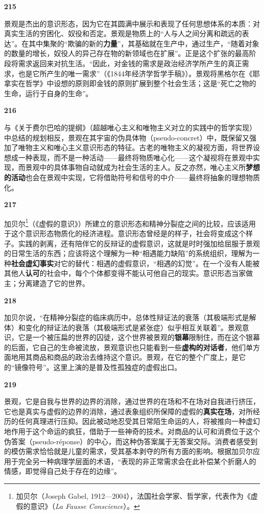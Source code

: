 \documentclass[fontset=fandol, a4paper, 12pt, openright]{ctexbook}
\makeatletter
\newcommand{\thesis}[1]{%
    \par\vspace{1.5em}%
    {\centering \textbf{\Large #1}\par}%
    \nobreak\vspace{0.5em}\nobreak
    \@afterindenttrue %
    \@afterheading    %
}
\makeatother
\begin{document}
\thesis{215}
景观是杰出的意识形态，因为它在其圆满中展示和表现了任何思想体系的本质：对真实生活的穷困化、奴役和否定。景观是物质上的“人与人之间分离和疏远的表达”。在其中集聚的“欺骗的新的\textbf{力量}”，其基础就在生产中，通过生产，“随着对象的数量的增长，奴役人的异己存在物的新领域也在扩展”。正是这个扩张的最高阶段将需求返回来对抗生活。“因此，对金钱的需求是政治经济学所产生的真正需求，也是它所产生的唯一需求”（《1844年经济学哲学手稿》）。景观将黑格尔在《耶拿实在哲学》中设想的原则即金钱的原则扩展到整个社会生活；这是“死亡之物的生命，运行于自身的生命”。

\thesis{216}
与《关于费尔巴哈的提纲》（超越唯心主义和唯物主义对立的实践中的哲学实现）中总结的规划相反，景观在其宇宙的伪具体物（pseudo-concret）中，既保留又强加了唯物主义和唯心主义意识形态的特征。古老的唯物主义的凝视方面，将世界设想成一种表现，而不是一种活动——最终将物质唯心化——这个凝视将在景观中实现，而景观中的具体事物自动就成为社会生活的主人。反之亦然，唯心主义所\textbf{梦想的活动}也会在景观中实现，它将借助符号和信号的中介——最终将抽象的理想物质化。

\thesis{217}
加贝尔\footnote{加贝尔（Joseph Gabel, 1912—2004），法国社会学家、哲学家，代表作为《虚假的意识》（\textit{La Fausse Conscience}）。}（《虚假的意识》）所建立的意识形态和精神分裂症之间的比较，应该适用于这个意识形态物质化的经济进程。意识形态曾经是的样子，社会将变成这个样子。实践的剥离，还有陪伴它的反辩证的虚假意识，这就是时时强加给屈服于景观的日常生活的东西；应该将这个理解为一种“相遇能力缺陷”的系统组织，理解为一种\textbf{社会虚幻事实}对它的替代：相遇的虚假意识，“相遇的幻觉”。在一个没有人能被其他人\textbf{认可}的社会中，每个个体都变得不能认可他自己的现实。意识形态当家做主；分离建造了它的世界。

\thesis{218}
加贝尔说，“在精神分裂症的临床病历中，总体性辩证法的衰落（其极端形式是解体）和变化的辩证法的衰落（其极端形式是紧张症）似乎相互关联着”。景观意识，它是一个被压扁的世界的囚徒，这个世界被景观的\textbf{银幕}限制住，而在这个银幕的后面，它自己的生命被流放，景观意识也只能看到一些\textbf{虚构的对话者}，他们单方面地用其商品和商品的政治去维持这个意识。景观，在它的整个广度上，是它的“镜像符号”。这里上演的是普及性孤独症的虚假出口。

\thesis{219}
景观，它是自我与世界的边界的消除，通过世界的在场和不在场对自我进行挤压，它也是真实与虚假的边界的消除，通过表象组织所保障的虚假的\textbf{真实在场}，对所经历的任何真理进行压抑。因此被动地忍受其日常陌生命运的人，将被推向一种虚幻地作用于这个命运的疯狂，借助于一些神奇的技术。对商品的认可和消费位于这个伪答案（pseudo-réponse）的中心，而这种伪答案属于无答案交际。消费者感受到的模仿需求恰恰就是儿童的需求，受其基本剥夺的所有方面的影响。根据加贝尔应用于完全另一种病理学层面的术语，“表现的非正常需求会在此补偿某个折磨人的情感，即觉得自己处于存在的边缘”。
\end{document}

